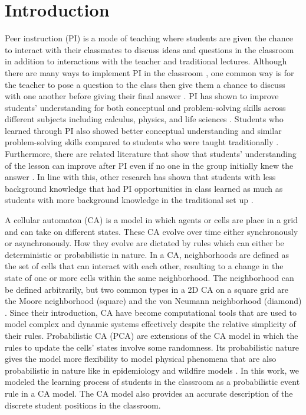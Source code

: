 \documentclass[10pt,a4paper,twoside]{article}
\begin{document}
\section{Introduction}\label{sec:intro}
Peer instruction (PI) is a mode of teaching where students are given the chance to interact with their classmates to discuss ideas and questions in the classroom in addition to interactions with the teacher and traditional lectures. Although there are many ways to implement PI in the classroom \cite{knight2018peer}, one common way is for the teacher to pose a question to the class then give them a chance to discuss with one another before giving their final answer \cite{crouch2001peer}. PI has shown to improve students' understanding for both conceptual and problem-solving skills across different subjects including calculus, physics, and life sciences \cite{crouch2001peer,smith2009peer}. Students who learned through PI also showed better conceptual understanding and similar problem-solving skills compared to students who were taught traditionally \cite{lasry2008peer}. Furthermore, there are related literature that show that students' understanding of the lesson can improve after PI even if no one in the group initially knew the answer \cite{smith2009peer}. In line with this, other research has shown that students with less background knowledge that had PI opportunities in class learned as much as students with more background knowledge in the traditional set up \cite{lasry2008peer}.

A cellular automaton (CA) is a model in which agents or cells are place in a grid and can take on different states. These CA evolve over time either synchronously or asynchronously. How they evolve are dictated by rules which can either be deterministic or probabilistic in nature. In a CA, neighborhoods are defined as the set of cells that can interact with each other, resulting to a change in the state of one or more cells within the same neighborhood. The neighborhood can be defined arbitrarily, but two common types in a 2D CA on a square grid are the Moore neighborhood (square) and the von Neumann neighborhood (diamond) \cite{weisstein2002cellular}. Since their introduction, CA have become computational tools that are used to model complex and dynamic systems effectively despite the relative simplicity of their rules. Probabilistic CA (PCA) are extensions of the CA model in which the rules to update the cells' states involve some randomness. Its probabilistic nature gives the model more flexibility to model physical phenomena that are also probabilistic in nature like in epidemiology and wildfire models \cite{louis2018probabilistic}. In this work, we modeled the learning process of students in the classroom as a probabilistic event rule in a CA model. The CA model also provides an accurate description of the discrete student positions in the classroom.
\end{document}
